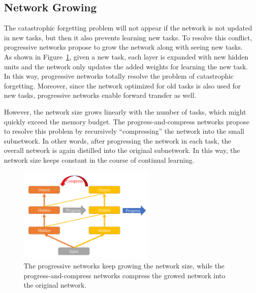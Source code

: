 \subsection{Network Growing}
The catastrophic forgetting problem will not appear if the network is not updated in new tasks, but then it also prevents learning new tasks. To resolve this conflict, progressive networks \citep{rusu2016progressive} propose to grow the network along with seeing new tasks. As shown in Figure~\ref{fig:progress}, given a new task, each layer is expanded with new hidden units and the network only updates the added weights for learning the new task. In this way, progressive networks totally resolve the problem of catastrophic forgetting. Moreover, since the network optimized for old tasks is also used for new tasks, progressive networks enable forward transfer as well. 

However, the network size grows linearly with the number of tasks, which might quickly exceed the memory budget. The progress-and-compress networks \citep{schwarz2018progress} propose to resolve this problem by recursively “compressing” the network into the small subnetwork. In other words, after progressing the network in each task, the overall network is again distilled into the original subnetwork. In this way, the network size keeps constant in the course of continual learning.

\begin{figure}[h]
\centering
\includegraphics[width=0.6\textwidth]{figures/progressive.pdf}
\caption{The {\color{blue} progressive networks} keep growing the network size, while the {\color{red} progress-and-compress} networks compress the growed network into the original network.  \label{fig:progress}}
\end{figure}

%

